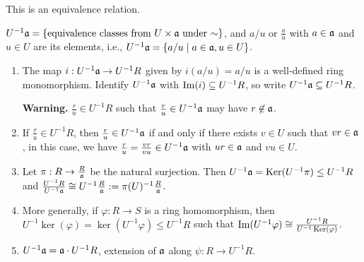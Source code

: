 \begin{fact}
    This is an equivalence relation.
\end{fact}

\begin{notation}
    $U^{-1}\mathfrak{a} = \{\text{equivalence classes from $U \times \mathfrak{a}$ under $\sim$}\}$, and $a/u$ or $\frac{a}{u}$ with $a \in \mathfrak{a}$ and $u \in U$ are its elements, i.e., $U^{-1}\mathfrak{a} = \{a/u \mid a \in \mathfrak{a}, u \in U\}$.
\end{notation}

\begin{proposition}
    \begin{enumerate}
        \item The map $i: U^{-1}\mathfrak{a} \to U^{-1}R$ given by $i(a/u) = a/u$ is a well-defined ring monomorphism. Identify $U^{-1}\mathfrak{a}$ with $\operatorname{Im}(i) \subseteq U^{-1}R$, so write $U^{-1}\mathfrak{a} \subseteq U^{-1}R$. \par 
            \textbf{Warning.} $\frac{r}{u} \in U^{-1}R$ such that $\frac{r}{u} \in U^{-1}\mathfrak{a}$ may have $r \not \in \mathfrak{a}$.
        \item If $\frac{r}{u} \in U^{-1}R$, then $\frac{r}{u} \in U^{-1}\mathfrak{a}$ if and only if there exists $v \in U$ such that $vr \in \mathfrak{a}$, in this case, we have $\frac{r}{u} = \frac{vr}{vu} \in U^{-1}\mathfrak{a}$ with $ur \in \mathfrak{a}$ and $vu \in U$.
        \item Let $\pi: R \to \frac{R}{\mathfrak{a}}$ be the natural surjection. Then $U^{-1}\mathfrak{a} = \operatorname{Ker}(U^{-1} \pi) \leq U^{-1}R$ and $\frac{U^{-1}R}{U^{-1}\mathfrak{a}} \cong U^{-1}\frac{R}{\mathfrak{a}} := \pi(U)^{-1} \frac{R}{\mathfrak{a}}$.
        \item More generally, if $\varphi: R \to S$ is a ring homomorphism, then $U^{-1} \ker(\varphi) = \ker(U^{-1}\varphi) \leq U^{-1}R$ such that $\operatorname{Im}(U^{-1}\varphi) \cong \frac{U^{-1}R}{U^{-1}\operatorname{Ker}(\varphi)}$.
        \item $U^{-1}\mathfrak{a} = \mathfrak{a} \cdot U^{-1}R$, extension of $\mathfrak{a}$ along $\psi: R \to U^{-1}R$.
    \end{enumerate}
\end{proposition}

